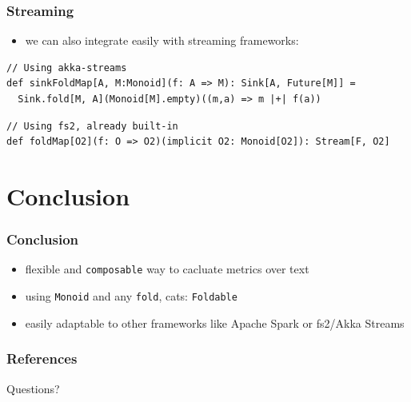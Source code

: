 \documentclass[aspectratio=169]{beamer}
\begin{document}
\begin{frame}[fragile]
  \frametitle{Streaming}
  \begin{itemize}
  \item we can also integrate easily with streaming frameworks:
  \end{itemize}
  \begin{verbatim}
// Using akka-streams
def sinkFoldMap[A, M:Monoid](f: A => M): Sink[A, Future[M]] =
  Sink.fold[M, A](Monoid[M].empty)((m,a) => m |+| f(a))
  \end{verbatim}

  \begin{verbatim}
// Using fs2, already built-in
def foldMap[O2](f: O => O2)(implicit O2: Monoid[O2]): Stream[F, O2]
  \end{verbatim}
\end{frame}

\section{Conclusion}

\begin{frame}
  \frametitle{Conclusion}
  \begin{itemize}
  \item flexible and \texttt{composable} way to cacluate metrics over
    text
  \item using \texttt{Monoid} and any \texttt{fold}, cats:
    \texttt{Foldable}
  \item easily adaptable to other frameworks like Apache Spark or
    fs2/Akka Streams
  \end{itemize}
\end{frame}

\begin{frame}
  \frametitle{References}
  \begin{center}
    {
      \Huge{}Questions?
    }
  \end{center}
\end{frame}
\end{document}
